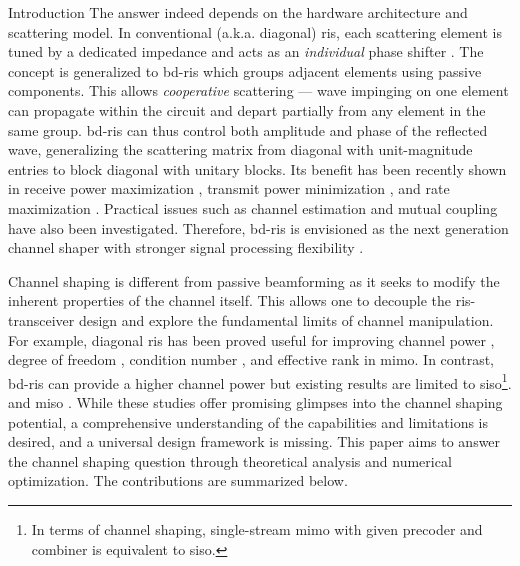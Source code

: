 \documentclass[journal]{IEEEtran}
\begin{document}
\begin{section}{Introduction}
	The answer indeed depends on the hardware architecture and scattering model.
	In conventional (a.k.a. diagonal) \gls{ris}, each scattering element is tuned by a dedicated impedance and acts as an \emph{individual} phase shifter \cite{Wu2020}.
	The concept is generalized to \gls{bd}-\gls{ris} \cite{Shen2020a,Li2023b} which groups adjacent elements using passive components.
	This allows \emph{cooperative} scattering --- wave impinging on one element can propagate within the circuit and depart partially from any element in the same group.
	\gls{bd}-\gls{ris} can thus control both amplitude and phase of the reflected wave, generalizing the scattering matrix from diagonal with unit-magnitude entries to block diagonal with  unitary blocks.
	Its benefit has been recently shown in receive power maximization \cite{Nerini2023,Santamaria2023,Fang2023,Nerini2023a}, transmit power minimization \cite{Zhou2023}, and rate maximization \cite{Zhou2023,Nerini2023a,Li2023d,Bartoli2023,Li2023c}.
	Practical issues such as channel estimation \cite{Li2023e} and mutual coupling \cite{Li2023f} have also been investigated.
	Therefore, \gls{bd}-\gls{ris} is envisioned as the next generation channel shaper with stronger signal processing flexibility \cite{Li2023g}.

	Channel shaping is different from passive beamforming as it seeks to modify the inherent properties of the channel itself.
	This allows one to decouple the \gls{ris}-transceiver design and explore the fundamental limits of channel manipulation.
	For example, diagonal \gls{ris} has been proved useful for improving channel power \cite{Ning2020}, degree of freedom \cite{Ozdogan2020,Li2023h}, condition number \cite{Zheng2022,Huang2023}, and effective rank \cite{ElMossallamy2021,Meng2023} in \gls{mimo}.
	In contrast, \gls{bd}-\gls{ris} can provide a higher channel power but existing results are limited to \gls{siso}\footnote{In terms of channel shaping, single-stream \gls{mimo} with given precoder and combiner \cite{Nerini2023} is equivalent to \gls{siso}.}. \cite{Nerini2023} and \gls{miso} \cite{Santamaria2023}.
	While these studies offer promising glimpses into the channel shaping potential, a comprehensive understanding of the capabilities and limitations is desired, and a universal design framework is missing.
	This paper aims to answer the channel shaping question through theoretical analysis and numerical optimization.
	The contributions are summarized below.


\end{section}
\end{document}
